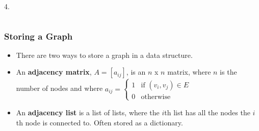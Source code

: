 \documentclass{beamer}
\begin{document}
\begin{frame}
\begin{columns}[c]
\begin{center}
 
4. 

\end{center}

\end{columns}
\end{frame}

\begin{frame}
\frametitle{Storing a Graph}
\begin{itemize}
\item There are two ways to store a graph in a data structure.
\item An \textbf{adjacency matrix}, $A = [a_{ij}]$,  is an $n$ x $n$ matrix, where $n$ is the number of nodes and where $a_{ij} =
	\begin{cases} 1 & \text{if $(v_i,v_j) \in E$}\\
	0 & \text{otherwise} \end{cases}$
\item An \textbf{adjacency list} is a list of lists, where the $i$th list has all the nodes the $i$th node is connected to. Often stored as a dictionary.
\end{itemize}
\end{frame}

\end{document}
